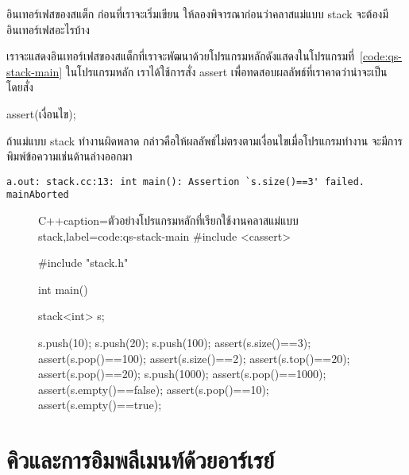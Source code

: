 \begin{quiz}{อิน{\wbr}เทอร์เฟส{\wbr}ของ{\wbr}สแต็ก}
ก่อน{\wbr}ที่{\wbr}เรา{\wbr}จะ{\wbr}เริ่ม{\wbr}เขียน ให้{\wbr}ลอง{\wbr}พิจารณา{\wbr}ก่อน{\wbr}ว่า{\wbr}ค{\wbr}ลา{\wbr}ส{\wbr}แม่แบบ {\ct stack} จะ{\wbr}ต้อง{\wbr}มี{\wbr}อิน{\wbr}เทอร์เฟส{\wbr}อะไร{\wbr}บ้าง{\wbr}
\end{quiz}

เรา{\wbr}จะ{\wbr}แสดง{\wbr}อิน{\wbr}เทอร์เฟส{\wbr}ของ{\wbr}สแต็ก{\wbr}ที่{\wbr}เรา{\wbr}จะ{\wbr}พัฒนา{\wbr}ด้วย{\wbr}โปรแกรมหลัก{\wbr}ดัง{\wbr}แสดง{\wbr}ใน{\wbr}โปรแกรม{\wbr}ที่~\ref{code:qs-stack-main}
ใน{\wbr}โปรแกรมหลัก เรา{\wbr}ได้{\wbr}ใช้{\wbr}การ{\wbr}สั่ง {\ct assert} เพื่อ{\wbr}ทดสอบ{\wbr}ผลลัพธ์{\wbr}ที่{\wbr}เรา{\wbr}คาด{\wbr}ว่า{\wbr}น่าจะ{\wbr}เป็น โดย{\wbr}สั่ง{\wbr}
\begin{center}
{\ct assert(}เงื่อนไข{\ct );}
\end{center}
ถ้า{\wbr}แม่แบบ {\ct stack} ทำงาน{\wbr}ผิดพลาด{\wbr}
กล่าวคือ{\wbr}ให้{\wbr}ผลลัพธ์{\wbr}ไม่{\wbr}ตรง{\wbr}ตาม{\wbr}เงื่อนไข{\wbr}เมื่อ{\wbr}โปรแกรม{\wbr}ทำงาน จะ{\wbr}มี{\wbr}การ{\wbr}พิมพ์{\wbr}ข้อความ{\wbr}เช่น{\wbr}ด้าน{\wbr}ล่าง{\wbr}ออก{\wbr}มา{\wbr}

{\latintext
\begin{verbatim}
a.out: stack.cc:13: int main(): Assertion `s.size()==3' failed.
mainAborted
\end{verbatim}
}

\begin{figure}
\latintext
\begin{codelist}{C++}{caption={\thaitext ตัวอย่าง{\wbr}โปรแกรมหลัก{\wbr}ที่{\wbr}เรียก{\wbr}ใช้{\wbr}งาน{\wbr}ค{\wbr}ลา{\wbr}ส{\wbr}แม่แบบ {\ct stack}\latintext},label=code:qs-stack-main}
#include <cassert>

#include "stack.h"

int main()
{
  stack<int> s;
  
  s.push(10);  s.push(20);  s.push(100);
  assert(s.size()==3);
  assert(s.pop()==100);
  assert(s.size()==2);
  assert(s.top()==20);
  assert(s.pop()==20);
  s.push(1000);
  assert(s.pop()==1000);
  assert(s.empty()==false);
  assert(s.pop()==10);
  assert(s.empty()==true);
}
\end{codelist}
\thaitext
\end{figure}

\section{คิว{\wbr}และ{\wbr}การ{\wbr}อิม{\wbr}พลี{\wbr}เมนท์{\wbr}ด้วย{\wbr}อาร์เรย์}


